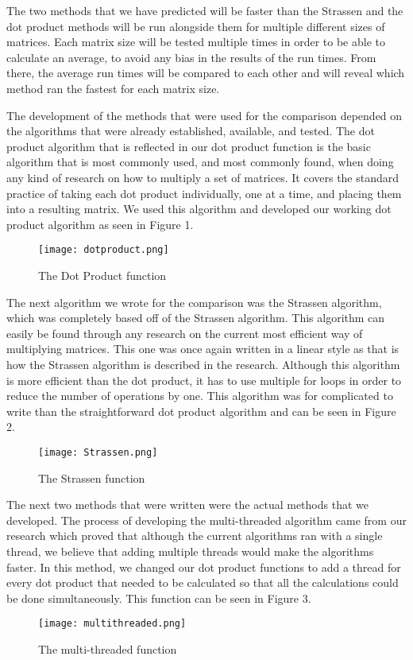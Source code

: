 \documentclass[conference]{IEEEtran}
\begin{document}
    The two methods that we have predicted will be faster than the Strassen and the dot product methods will be run alongside them for multiple different sizes of matrices. Each matrix size will be tested multiple times in order to be able to calculate an average, to avoid any bias in the results of the run times. From there, the average run times will be compared to each other and will reveal which method ran the fastest for each matrix size.

    The development of the methods that were used for the comparison depended on the algorithms that were already established, available, and tested. The dot product algorithm that is reflected in our dot product function is the basic algorithm that is most commonly used, and most commonly found, when doing any kind of research on how to multiply a set of matrices. It covers the standard practice of taking each dot product individually, one at a time, and placing them into a resulting matrix. We used this algorithm and developed our working dot product algorithm as seen in Figure 1.
    \begin{figure}
        \centering
        \texttt{[image: dotproduct.png]}
        \caption{The Dot Product function}
        \label{fig:dotproduct}
    \end{figure}

    The next algorithm we wrote for the comparison was the Strassen algorithm, which was completely based off of the Strassen algorithm. This algorithm can easily be found through any research on the current most efficient way of multiplying matrices. This one was once again written in a linear style as that is how the Strassen algorithm is described in the research. Although this algorithm is more efficient than the dot product, it has to use multiple for loops in order to reduce the number of operations by one. This algorithm was for complicated to write than the straightforward dot product algorithm and can be seen in Figure 2.
    \begin{figure}
        \centering
        \texttt{[image: Strassen.png]}
        \caption{The Strassen function}
        \label{fig:Strassen}
    \end{figure}

    The next two methods that were written were the actual methods that we developed. The process of developing the multi-threaded algorithm came from our research which proved that although the current algorithms ran with a single thread, we believe that adding multiple threads would make the algorithms faster. In this method, we changed our dot product functions to add a thread for every dot product that needed to be calculated so that all the calculations could be done simultaneously. This function can be seen in Figure 3.
    \begin{figure}
        \centering
        \texttt{[image: multithreaded.png]}
        \caption{The multi-threaded function}
        \label{fig:multithreaded}
    \end{figure}
\end{document}
